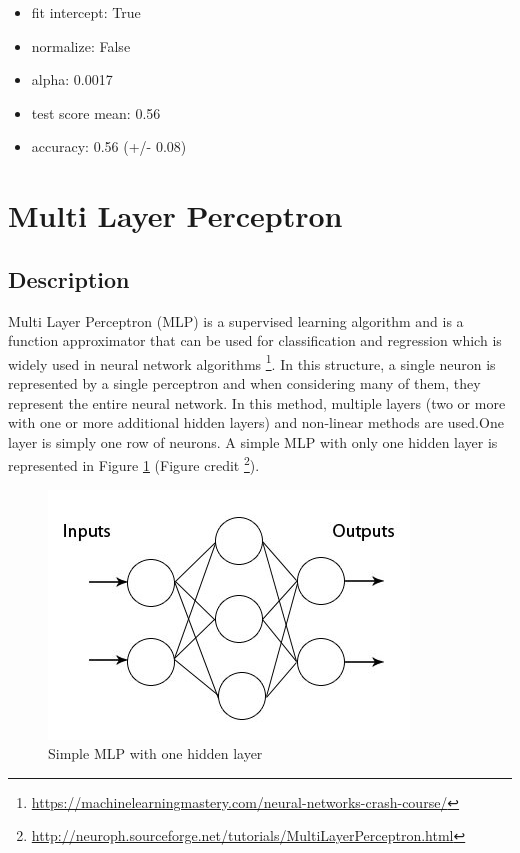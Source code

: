 \documentclass[twocolumn]{scrartcl}
\begin{document}
\begin{itemize}
    \item{fit intercept: True}
    \item{normalize: False}
    \item{alpha: 0.0017}
    \item{test score mean: 0.56}
    \item{accuracy: 0.56 (+/- 0.08)}
\end{itemize}

\section{Multi Layer Perceptron}
\subsection{Description}
Multi Layer Perceptron (MLP) is a supervised learning algorithm and is a function approximator that can be used for classification and regression which is widely used in neural network algorithms \footnote{\url{https://machinelearningmastery.com/neural-networks-crash-course/}}.
In this structure, a single neuron is represented by a single perceptron and when considering many of them, they represent the entire neural network. In this method, multiple layers (two or more with one or more additional hidden layers) and non-linear methods are used.One layer is simply one row of neurons. A simple MLP with only one hidden layer is represented in Figure \ref{fig:mlp} (Figure credit \footnote{\url{http://neuroph.sourceforge.net/tutorials/MultiLayerPerceptron.html}}).

\begin{figure}[h]
    \centering
    \includegraphics[width=\linewidth]{images/mlp.jpeg}
    \caption{Simple MLP with one hidden layer}
    \label{fig:mlp}
\end{figure}
\end{document}
